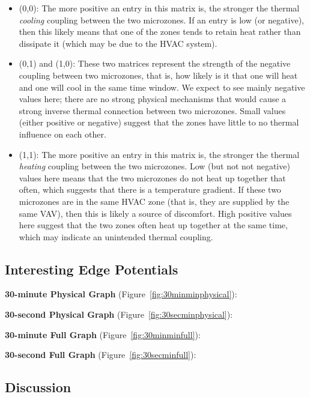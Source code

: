 \begin{itemize}[noitemsep,nolistsep]
\item (0,0): The more positive an entry in this matrix is, the stronger the thermal \emph{cooling} coupling between the two microzones.
If an entry is low (or negative), then this likely means that one of the zones tends to retain heat rather than dissipate it (which may be due to the HVAC system).
\item (0,1) and (1,0): These two matrices represent the strength of the negative coupling between two microzones, that is, how likely is it that one will heat and one will cool in the same time window.
We expect to see mainly negative values here; there are no strong physical mechanisms that would cause a strong inverse thermal connection between two microzones.
Small values (either positive or negative) suggest that the zones have little to no thermal influence on each other.
\item (1,1): The more positive an entry in this matrix is, the stronger the thermal \emph{heating} coupling between the two microzones.
Low (but not not negative) values here means that the two microzones do not heat up together that often, which suggests that there is a temperature gradient.
If these two microzones are in the same HVAC zone (that is, they are supplied by the same VAV), then this is likely a source of discomfort.
High positive values here suggest that the two zones often heat up together at the same time, which may indicate an unintended thermal coupling.
\end{itemize}

\subsection{Interesting Edge Potentials}

\textbf{30-minute Physical Graph} (Figure~\ref{fig:30minminphysical}):

\textbf{30-second Physical Graph} (Figure~\ref{fig:30secminphysical}):

\textbf{30-minute Full Graph} (Figure~\ref{fig:30minminfull}):

\textbf{30-second Full Graph} (Figure~\ref{fig:30secminfull}):

\subsection{Discussion}
